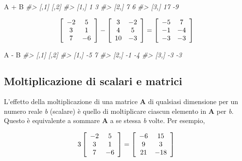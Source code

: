 \documentclass[
  11pt,
]{krantz}
\makeatletter
\newenvironment{Shaded}{\begin{snugshade}}{\end{snugshade}}
\newcommand{\CommentTok}[1]{\textcolor[rgb]{0.37,0.37,0.37}{\textit{#1}}}
\newcommand{\NormalTok}[1]{#1}
\newcommand{\SpecialCharTok}[1]{\textcolor[rgb]{0,0,0}{#1}}
\newenvironment{kframe}{%
\medskip{}
\setlength{\fboxsep}{.8em}
 \def\at@end@of@kframe{}%
 \ifinner\ifhmode%
  \def\at@end@of@kframe{\end{minipage}}%
  \begin{minipage}{\columnwidth}%
 \fi\fi%
 \def\FrameCommand##1{\hskip\@totalleftmargin \hskip-\fboxsep
 \colorbox{shadecolor}{##1}\hskip-\fboxsep
     \hskip-\linewidth \hskip-\@totalleftmargin \hskip\columnwidth}%
 \MakeFramed {\advance\hsize-\width
   \@totalleftmargin\z@ \linewidth\hsize
   \@setminipage}}%
 {\par\unskip\endMakeFramed%
 \at@end@of@kframe}
\renewenvironment{Shaded}{\begin{kframe}}{\end{kframe}}
\theoremstyle{definition}
\theoremstyle{definition}
\theoremstyle{definition}
\theoremstyle{definition}
\theoremstyle{remark}
\makeatother
\begin{document}
\begin{Shaded}
\begin{Highlighting}[]
\NormalTok{A }\SpecialCharTok{+}\NormalTok{ B}
\CommentTok{\#\textgreater{}      [,1] [,2]}
\CommentTok{\#\textgreater{} [1,]    1    3}
\CommentTok{\#\textgreater{} [2,]    7    6}
\CommentTok{\#\textgreater{} [3,]   17   {-}9}
\end{Highlighting}
\end{Shaded}

\[
\left[ \begin{array}{c c}
-2 & 5\\
3 & 1\\
7 & -6
\end{array}
 \right]-
\left[ \begin{array}{c c}
3 & -2\\
4 & 5\\
10 & -3
\end{array}
 \right]=
 \left[ \begin{array}{c c}
-5 & 7\\
-1 & -4\\
-3 & -3
\end{array}
 \right]
 \]

\begin{Shaded}
\begin{Highlighting}[]
\NormalTok{A }\SpecialCharTok{{-}}\NormalTok{ B}
\CommentTok{\#\textgreater{}      [,1] [,2]}
\CommentTok{\#\textgreater{} [1,]   {-}5    7}
\CommentTok{\#\textgreater{} [2,]   {-}1   {-}4}
\CommentTok{\#\textgreater{} [3,]   {-}3   {-}3}
\end{Highlighting}
\end{Shaded}

\hypertarget{moltiplicazione-di-scalari-e-matrici}{%
\subsection{Moltiplicazione di scalari e matrici}\label{moltiplicazione-di-scalari-e-matrici}}

L'effetto della moltiplicazione di una matrice \(\boldsymbol{A}\) di qualsiasi dimensione per un numero reale \emph{b} (scalare) è quello di moltiplicare ciascun elemento in \(\boldsymbol{A}\) per \emph{b}. Questo è equivalente a sommare \(\boldsymbol{A}\) a se stessa \emph{b} volte. Per esempio,

\[
3 \left[ \begin{array}{c c}
-2 & 5\\
3 & 1\\
7 & -6
\end{array}
 \right]=
\left[ \begin{array}{c c}
-6 & 15\\
9 & 3\\
21 & -18
\end{array}
 \right]
 \]
\end{document}
